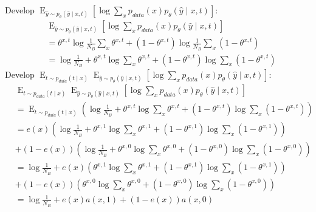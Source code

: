 \documentclass[oneside,12pt]{article}
\begin{document}
%
Develop $\operatorname{E}_{\hat{y} \sim p_\theta(\hat{y} \mid x,t)}
        \left[\operatorname{log} \sum_x p_{data}(x) p_\theta(\hat{y} \mid x,t)\right]$:
%
\begin{equation}
    \begin{split}
        &\operatorname{E}_{\hat{y} \sim p_\theta(\hat{y} \mid x,t)}
        \left[\operatorname{log} \sum_x p_{data}(x) p_\theta(\hat{y} \mid x,t)\right]\\
        &= \theta^{x,t}\operatorname{log} \frac{1}{N_B} \sum_x \theta^{x,t} + (1-\theta^{x,t})\operatorname{log} \frac{1}{N_B} \sum_x (1-\theta^{x,t})\\
        &= \operatorname{log} \frac{1}{N_B} + \theta^{x,t}\operatorname{log} \sum_x \theta^{x,t} + (1-\theta^{x,t})\operatorname{log} \sum_x (1-\theta^{x,t})
    \end{split}
\end{equation}
%
Develop $\operatorname{E}_{t \sim p_{data}(t \mid x)}
        \operatorname{E}_{\hat{y} \sim p_\theta(\hat{y} \mid x,t)}
        \left[\operatorname{log} \sum_x p_{data}(x) p_\theta(\hat{y} \mid x,t)\right]$:
%
\begin{equation}
    \begin{split}
        &\operatorname{E}_{t \sim p_{data}(t \mid x)}
        \operatorname{E}_{\hat{y} \sim p_\theta(\hat{y} \mid x,t)}
        \left[\operatorname{log} \sum_x p_{data}(x) p_\theta(\hat{y} \mid x,t)\right]\\
        &= \operatorname{E}_{t \sim p_{data}(t \mid x)} \left(\operatorname{log} \frac{1}{N_B} + \theta^{x,t}\operatorname{log} \sum_x \theta^{x,t} + (1-\theta^{x,t})\operatorname{log} \sum_x (1-\theta^{x,t})\right)\\
        &=e(x)\left( \operatorname{log} \frac{1}{N_B} + \theta^{x,1}\operatorname{log} \sum_x \theta^{x,1} + (1-\theta^{x,1})\operatorname{log} \sum_x (1-\theta^{x,1})\right)\\
        &+ (1-e(x))\left( \operatorname{log} \frac{1}{N_B} + \theta^{x,0}\operatorname{log} \sum_x \theta^{x,0} + (1-\theta^{x,0})\operatorname{log} \sum_x (1-\theta^{x,0})\right)\\
        &=\operatorname{log} \frac{1}{N_B} + e(x)\left(\theta^{x,1}\operatorname{log} \sum_x \theta^{x,1} + (1-\theta^{x,1})\operatorname{log} \sum_x (1-\theta^{x,1})\right)\\
        &+ (1-e(x))\left(\theta^{x,0}\operatorname{log} \sum_x \theta^{x,0} + (1-\theta^{x,0})\operatorname{log} \sum_x (1-\theta^{x,0})\right)\\
        &=\operatorname{log} \frac{1}{N_B} + e(x)a(x,1)
        + (1-e(x))a(x,0)
    \end{split}
\end{equation}
\end{document}

